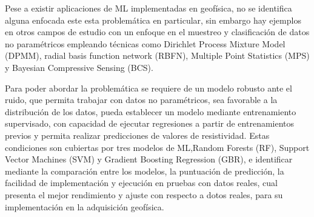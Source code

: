 Pese a existir aplicaciones de ML implementadas en geofísica, no se identifica alguna enfocada este esta problemática en particular, sin embargo hay ejemplos en otros campos de estudio con un enfoque en el muestreo y clasificación de datos no paramétricos \citep{entezami2022non, bkassiny2013multidimensional, shi2021non} empleando técnicas como Dirichlet Process Mixture Model (DPMM), radial basis function network (RBFN),  Multiple Point Statistics (MPS) y Bayesian Compressive Sensing (BCS).

Para poder abordar la problemática se requiere de un modelo robusto ante el ruido, que permita trabajar con datos no paramétricos, sea favorable a la distribución de los datos, pueda establecer un modelo mediante entrenamiento supervisado, con capacidad de ejecutar regresiones a partir de entrenamientos previos y permita realizar predicciones de valores de resistividad. Estas condiciones son cubiertas por tres modelos de ML,Random Forests (RF), Support Vector Machines (SVM) y Gradient Boosting Regression (GBR), e identificar mediante la comparación entre los modelos, la puntuación de predicción, la facilidad de implementación y ejecución en pruebas con datos reales, cual presenta el mejor rendimiento y ajuste con respecto a dotos reales, para su implementación en la adquisición geofísica. 
